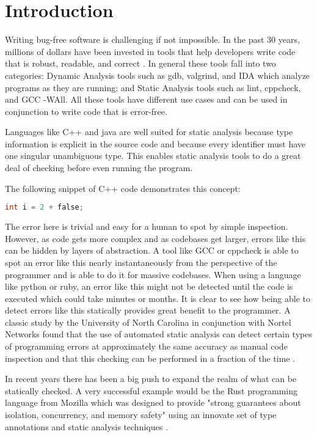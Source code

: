 \chapter{Introduction}

Writing bug-free software is challenging if not impossible.  In the past 30 years, millions of dollars have been invested in tools that help developers write code that is robust, readable, and correct \cite{staticanal}.  In general these tools fall into two categories:  Dynamic Analysis tools such as gdb, valgrind, and IDA which analyze programs as they are running; and Static Analysis tools such as lint, cppcheck, and GCC -WAll.  All these tools have different use cases and can be used in conjunction to write code that is error-free.

Languages like C++ and java are well suited for static analysis because type information is explicit in the source code and because every identifier must have one singular unambiguous type.  This enables static analysis tools to do a great deal of checking before even running the program.  

The following snippet of C++ code demonstrates this concept:

\begin{lstlisting}[language=C]
    int i = 2 + false;
\end{lstlisting}

The error here is trivial and easy for a human to spot by simple inspection.  However, as code gets more complex and as codebases get larger, errors like this can be hidden by layers of abstraction.  A tool like GCC or cppcheck is able to spot an error like this nearly instantaneously from the perspective of the programmer and is able to do it for massive codebases.  When using a language like python or ruby, an error like this might not be detected until the code is executed which could take minutes or months.  It is clear to see how being able to detect errors like this statically provides great benefit to the programmer.  A classic study by the University of North Carolina in conjunction with Nortel Networks found that the use of automated static analysis can detect certain types of programming errors at approximately the same accuracy as manual code inspection and that this checking can be performed in a fraction of the time \cite{staticanal}.  

In recent years there has been a big push to expand the realm of what can be statically checked.  A very successful example would be the Rust programming language from Mozilla which was designed to provide "strong guarantees about isolation, concurrency, and memory safety" using an innovate set of type annotations and static analysis techniques \cite{rust-is-dope}. 

